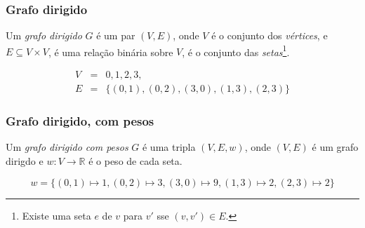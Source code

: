 \documentclass{beamer}
\begin{document}
\begin{frame}
\frametitle{Grafo dirigido}

\begin{definition}
Um \emph{grafo dirigido} $G$ é um par $(V, E)$, onde $V$ é o conjunto dos \emph{vértices}, e
$E \subseteq V \times V$, é uma relação binária sobre $V$, é o conjunto das \emph{setas}\footnote{Existe uma seta $e$ de $v$ para $v'$ sse $(v, v') \in E$.}.
\end{definition}

\begin{center}
$$
\begin{array}{rcl}
V & = & {0, 1, 2, 3}, \\
E & = &\{ (0,1), (0,2), (3,0), (1, 3), (2,3) \}
\end{array}
$$ %
\end{center}

\end{frame}

\begin{frame}
\frametitle{Grafo dirigido, com pesos}

\begin{definition}
Um \emph{grafo dirigido com pesos} $G$ é uma tripla $(V, E, w)$, onde $(V, E)$ é um grafo dirigdo e $w: V \rightarrow \mathbb{R}$ é o peso de cada seta.
\end{definition}

\begin{center}
\end{center}
$$w = \{ (0, 1) \mapsto
1, (0, 2) \mapsto 3, (3,0) \mapsto 9, (1,3) \mapsto 2, (2, 3) \mapsto 2 \}
$$

\end{frame}
\end{document}
